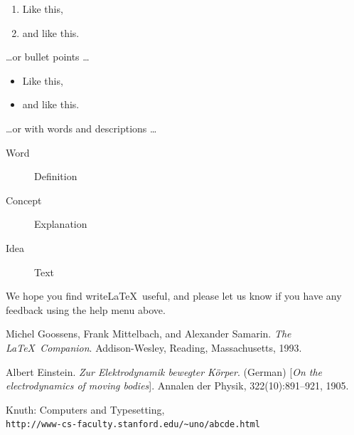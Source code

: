 \documentclass[a4paper]{article}
\begin{document}
\begin{enumerate}
\item Like this,
\item and like this.
\end{enumerate}
\dots or bullet points \dots
\begin{itemize}
\item Like this,
\item and like this.
\end{itemize}
\dots or with words and descriptions \dots
\begin{description}
\item[Word] Definition
\item[Concept] Explanation
\item[Idea] Text
\end{description}

We hope you find write\LaTeX\ useful, and please let us know if you have any feedback using the help menu above.

\renewcommand{\refname}{Bibliografia}
\begin{thebibliography}{9}
  Michel Goossens, Frank Mittelbach, and Alexander Samarin. 
  \textit{The \LaTeX\ Companion}. 
  Addison-Wesley, Reading, Massachusetts, 1993.
   
  Albert Einstein. 
  \textit{Zur Elektrodynamik bewegter K{\"o}rper}. (German) 
  [\textit{On the electrodynamics of moving bodies}]. 
  Annalen der Physik, 322(10):891–921, 1905.
   
  Knuth: Computers and Typesetting,
  \\\texttt{http://www-cs-faculty.stanford.edu/\~{}uno/abcde.html}
  \end{thebibliography}
\end{document}
